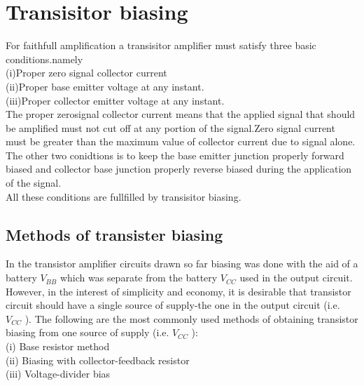 \section{Transisitor biasing}
   For faithfull amplification a transisitor amplifier must satisfy three basic conditions.namely\\
   (i)Proper zero signal collector current\\
   {(ii)}Proper base emitter voltage at any instant.\\
   (iii)Proper collector emitter voltage at any instant.\\
The proper zerosignal collector current means that the applied signal that should be amplified must not cut off at any portion of the signal.Zero signal current must be greater than the maximum value of collector current due to signal alone.\\
   The other two conidtions is to keep the base emitter junction properly forward biased and collector base junction properly reverse biased during the application of the signal.\\
   All these conditions are fullfilled by transisitor biasing.
   \subsection{Methods of transister biasing}
   In the transistor amplifier circuits drawn so far biasing was done with the aid of a battery $V_{B B}$ which was separate from the battery $V_{C C}$ used in the output circuit. However, in the interest of simplicity and economy, it is desirable that transistor circuit should have a single source of supply-the one in the output circuit (i.e. $V_{C C}$ ). The following are the most commonly used methods of obtaining transistor biasing from one source of supply (i.e. $V_{C C}$ ):\\
   (i) Base resistor method\\
   (ii) Biasing with collector-feedback resistor\\
   (iii) Voltage-divider bias
